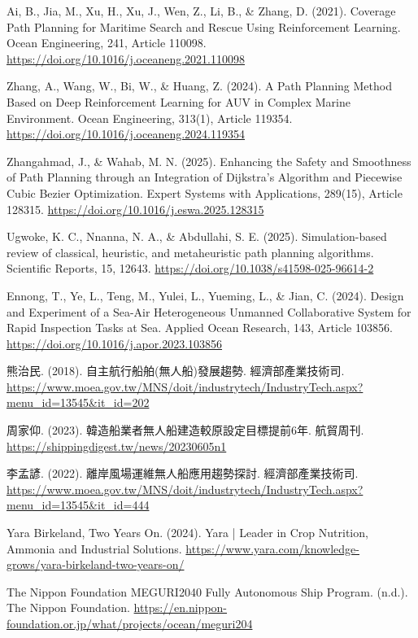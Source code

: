 \documentclass[12pt,a4paper]{article}
\begin{document}
\begin{thebibliography}{9}
Ai, B., Jia, M., Xu, H., Xu, J., Wen, Z., Li, B., \& Zhang, D. (2021). 
Coverage Path Planning for Maritime Search and Rescue Using Reinforcement Learning. 
Ocean Engineering, 241, Article 110098.
\url{https://doi.org/10.1016/j.oceaneng.2021.110098}

Zhang, A., Wang, W., Bi, W., \& Huang, Z. (2024). 
A Path Planning Method Based on Deep Reinforcement Learning for AUV in Complex Marine Environment. 
Ocean Engineering, 313(1), Article 119354. 
\url{https://doi.org/10.1016/j.oceaneng.2024.119354}

Zhangahmad, J., \& Wahab, M. N. (2025). 
Enhancing the Safety and Smoothness of Path Planning through an Integration of Dijkstra's Algorithm and Piecewise Cubic Bezier Optimization. 
Expert Systems with Applications, 289(15), Article 128315. 
\url{https://doi.org/10.1016/j.eswa.2025.128315}

Ugwoke, K. C., Nnanna, N. A., \& Abdullahi, S. E. (2025). 
Simulation-based review of classical, heuristic, and metaheuristic path planning algorithms. 
Scientific Reports, 15, 12643. 
\url{https://doi.org/10.1038/s41598-025-96614-2}

Ennong, T., Ye, L., Teng, M., Yulei, L., Yueming, L., \& Jian, C. (2024). 
Design and Experiment of a Sea-Air Heterogeneous Unmanned Collaborative System for Rapid Inspection Tasks at Sea. 
Applied Ocean Research, 143, Article 103856. 
\url{https://doi.org/10.1016/j.apor.2023.103856}

熊治民. (2018). 
自主航行船舶(無人船)發展趨勢. 
經濟部產業技術司. 
\url{https://www.moea.gov.tw/MNS/doit/industrytech/IndustryTech.aspx?menu_id=13545&it_id=202}

周家仰. (2023). 
韓造船業者無人船建造較原設定目標提前6年. 
航貿周刊. 
\url{https://shippingdigest.tw/news/20230605n1}

李孟諺. (2022). 
離岸風場運維無人船應用趨勢探討. 
經濟部產業技術司. 
\url{https://www.moea.gov.tw/MNS/doit/industrytech/IndustryTech.aspx?menu_id=13545&it_id=444}

Yara Birkeland, Two Years On. (2024). 
Yara | Leader in Crop Nutrition, Ammonia and Industrial Solutions. 
\url{https://www.yara.com/knowledge-grows/yara-birkeland-two-years-on/}

The Nippon Foundation MEGURI2040 Fully Autonomous Ship Program. (n.d.). 
The Nippon Foundation. 
\url{https://en.nippon-foundation.or.jp/what/projects/ocean/meguri204}


\end{thebibliography}
\end{document}

